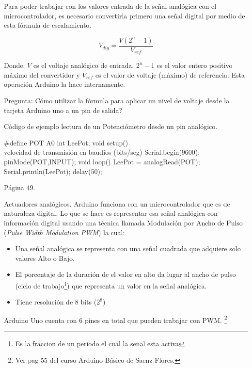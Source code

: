 \documentclass{beamer}
\begin{document}
\begin{frame}
Para poder trabajar con los valores entrada de la señal analógica con el microcontrolador, es necesario convertirla primero una señal digital por medio de esta fórmula de escalamiento.



$$V_{dig} =  \frac{ V (2^n - 1) }{V_{ref}} $$

Donde: $V$ es el voltaje analógico de entrada. $2^n-1$ es el valor entero positivo máximo del convertidor y $V_{ref}$ es el valor de voltaje (máximo) de referencia. Esta operación Arduino la hace internamente. 

Pregunta: Cómo utilizar la fórmula para aplicar un nivel de voltaje desde la tarjeta Arduino uno a un pin de salida? 

\end{frame}


\begin{frame}[fragile]
Código de ejemplo lectura de un Potenciómetro desde un pin analógico.

\tiny
\begin{verbatimtab}
#define POT A0
int LeePot;
void setup() {
	\\ velocidad de transmisión en baudios (bits/seg)
  Serial.begin(9600); 
  pinMode(POT,INPUT);
}
void loop() {
  LeePot = analogRead(POT);
  Serial.println(LeePot);
  delay(50);
}
\end{verbatimtab}

Página 49.
\end{frame}


\begin{frame}{Actuadores analógicos.}
Arduino funciona con un microcontrolador que es de naturaleza digital. 
Lo que se hace es representar esa señal analógica con información digital usando una técnica llamada Modulación por Ancho de Pulso (\textit{Pulse Width Modulation PWM}) la cual:

\begin{itemize}
\item Una señal analógica se representa con una señal cuadrada que adquiere solo valores Alto o Bajo.
\item El porcentaje de la duración de el valor en alto da lugar al ancho de pulso (ciclo de trabajo\footnote{Es la fraccion de un periodo el cual la senal esta activa}) que representa un valor en la señal analógica.
\item Tiene resolución de 8 bits ($2^8$)
\end{itemize}
Arduino Uno cuenta con 6 pines en total que pueden trabajar con PWM. \footnote{Ver pag 55 del curso Arduino Básico de Saenz Flores.}

\end{frame}
\end{document}
